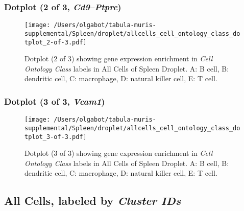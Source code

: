 \clearpage

\subsubsection{Dotplot (2 of 3, \emph{Cd9}--\emph{Ptprc})}
\begin{figure}[h]
\centering
\texttt{[image: /Users/olgabot/tabula-muris-supplemental/Spleen/droplet/allcells\_cell\_ontology\_class\_dotplot\_2-of-3.pdf]}

\caption{ Dotplot (2 of 3)  showing gene expression enrichment in \emph{Cell Ontology Class} labels in All Cells of Spleen Droplet. A: B cell, B: dendritic cell, C: macrophage, D: natural killer cell, E: T cell.}
\end{figure}


\clearpage

\subsubsection{Dotplot (3 of 3, \emph{Vcam1})}
\begin{figure}[h]
\centering
\texttt{[image: /Users/olgabot/tabula-muris-supplemental/Spleen/droplet/allcells\_cell\_ontology\_class\_dotplot\_3-of-3.pdf]}

\caption{ Dotplot (3 of 3)  showing gene expression enrichment in \emph{Cell Ontology Class} labels in All Cells of Spleen Droplet. A: B cell, B: dendritic cell, C: macrophage, D: natural killer cell, E: T cell.}
\end{figure}


\clearpage

\subsection{All Cells, labeled by \emph{Cluster IDs}}
